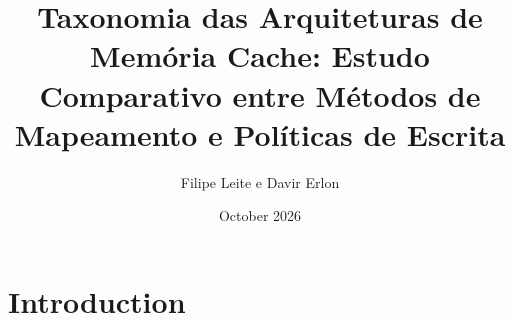 \documentclass{article}
\title{Taxonomia das Arquiteturas de Memória Cache: Estudo Comparativo entre Métodos de
Mapeamento e Políticas de Escrita}
\author{Filipe Leite e Davir Erlon}
\date{October 2026}
\begin{document}
\maketitle

\section{Introduction}
\end{document}
